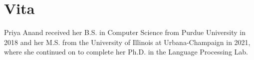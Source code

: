 \documentclass[fullpage]{uiucthesis}
\begin{document}
\backmatter




\chapter{Vita}

Priya Anand received her B.S. in Computer Science from Purdue
University in 2018 and her M.S. from the University of Illinois at
Urbana-Champaign in 2021, where she continued on to complete her
Ph.D. in the Language Processing Lab.
\end{document}
